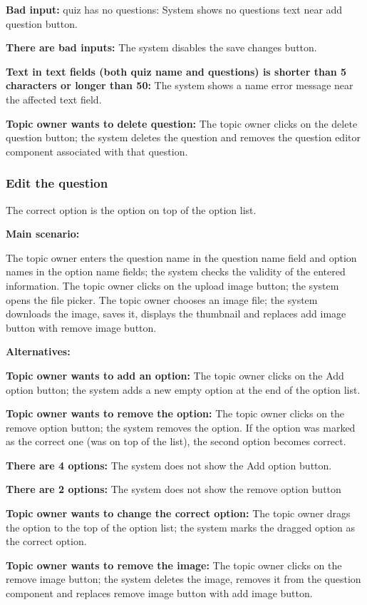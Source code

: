 \documentclass[
    english, %
]{VUMIFPSkursinis}
\begin{document}
\textbf{Bad input:} quiz has no questions: System shows no questions text near add question button.

\textbf{There are bad inputs:} The system disables the save changes button.

\textbf{Text in text fields (both quiz name and questions) is shorter than 5 characters or longer than 50:} The system shows a name error message near the affected text field.

\textbf{Topic owner wants to delete question:} The topic owner clicks on the delete question button; the system deletes the question and removes the question editor component associated with that question.

\subsubsection{Edit the question}

The correct option is the option on top of the option list.

\noindent\textbf{\fontsize{13}{15}\selectfont Main scenario:}

The topic owner enters the question name in the question name field and option names in the option name fields; the system checks the validity of the entered information. The topic owner clicks on the upload image button; the system opens the file picker. The topic owner chooses an image file; the system downloads the image, saves it, displays the thumbnail and replaces add image button with remove image button.

\noindent\textbf{\fontsize{13}{15}\selectfont Alternatives:}

\textbf{Topic owner wants to add an option:} The topic owner clicks on the Add option button; the system adds a new empty option at the end of the option list.

\textbf{Topic owner wants to remove the option:} The topic owner clicks on the remove option button; the system removes the option. If the option was marked as the correct one (was on top of the list), the second option becomes correct.

\textbf{There are 4 options:} The system does not show the Add option button.

\textbf{There are 2 options:} The system does not show the remove option button

\textbf{Topic owner wants to change the correct option:} The topic owner drags the option to the top of the option list; the system marks the dragged option as the correct option.

\textbf{Topic owner wants to remove the image:} The topic owner clicks on the remove image button; the system deletes the image, removes it from the question component and replaces remove image button with add image button.

\listoffigures
\printbibliography[heading=bibintoc]
\end{document}
